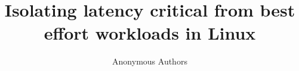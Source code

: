 \documentclass[sigconf,anonymous,natbib=false,10pt]{acmart}
\begin{document}

\date{}

\title{Isolating latency critical from best effort workloads in Linux}


\author{
{\rm Anonymous Authors}\\
} %


\maketitle











% 
\printbibliography

\end{document}
